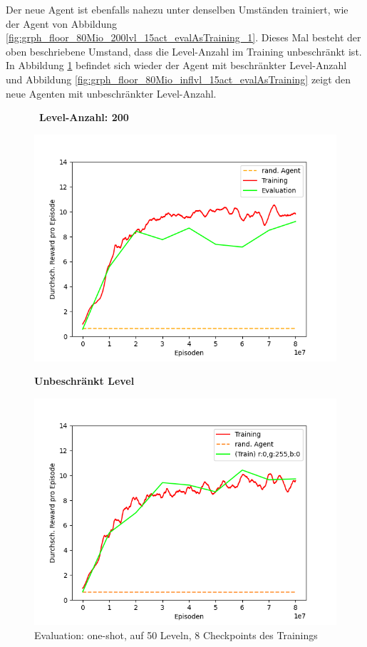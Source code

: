 Der neue Agent ist ebenfalls nahezu unter denselben Umständen trainiert, wie der Agent von Abbildung \ref{fig:grph_floor_80Mio_200lvl_15act_evalAsTraining_1}. Dieses Mal besteht der oben beschriebene Umstand, dass die Level-Anzahl im Training unbeschränkt ist. In Abbildung \ref{fig:grph_floor_80Mio_200lvl_15act_Training_1} befindet sich wieder der Agent mit beschränkter Level-Anzahl und Abbildung \ref{fig:grph_floor_80Mio_inflvl_15act_evalAsTraining} zeigt den neue Agenten mit unbeschränkter Level-Anzahl. 
\begin{figure}[htp!]
   \centering
   \captionsetup{width=0.45\linewidth} 
    \begin{minipage}{0.48\linewidth}
        \centering\
        \textbf{Level-Anzahl: 200}\par\medskip
        \includegraphics[scale=0.5]{abb/_graphen/floor_80Mio_200lvl_15act_Training_evalAsTraining}
        \caption{Evaluation: one-shot, auf 50 Leveln, 8 Checkpoints des Trainings}
        \label{fig:grph_floor_80Mio_200lvl_15act_Training_1}
    \end{minipage}
    \centering
    \begin{minipage}{0.48\linewidth}
        \centering
        \textbf{Unbeschränkt Level}\par\medskip
        \includegraphics[scale=0.5]{abb/_graphen/floor_80Mio_inflvl_15act_Training_evalAsTraining_14}

\end{minipage}
\end{figure}

